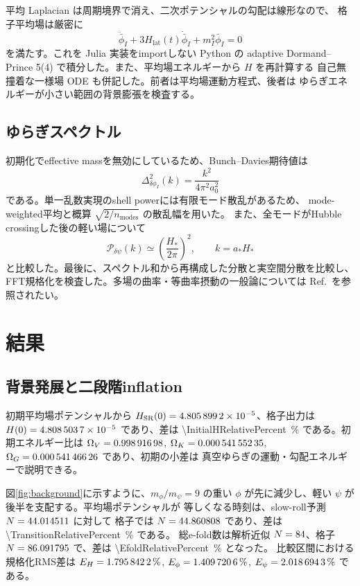 \documentclass[a4paper,11pt]{ltjsarticle}
\begin{document}
平均 Laplacian は周期境界で消え、二次ポテンシャルの勾配は線形なので、
格子平均場は厳密に
\begin{equation}
 \ddot{\bar\phi}_I+3H_{\mathrm{lat}}(t)\dot{\bar\phi}_I
 +m_I^2\bar\phi_I=0
\end{equation}
を満たす。これを Julia 実装をimportしない Python の adaptive
Dormand--Prince 5(4) で積分した。また、平均場エネルギーから $H$ を再計算する
自己無撞着な一様場 ODE も併記した。前者は平均場運動方程式、後者は
ゆらぎエネルギーが小さい範囲の背景膨張を検査する。

\subsection{ゆらぎスペクトル}

初期化でeffective massを無効にしているため、Bunch--Davies期待値は
\begin{equation}
 \Delta_{\delta\phi_I}^2(k)=\frac{k^2}{4\pi^2a_0^2}
\end{equation}
である。単一乱数実現のshell powerには有限モード散乱があるため、
mode-weighted平均と概算 $\sqrt{2/n_{\mathrm{modes}}}$ の散乱幅を用いた。
また、全モードがHubble crossingした後の軽い場について
\begin{equation}
 \mathcal P_{\delta\psi}(k)\simeq
 \left(\frac{H_*}{2\pi}\right)^2,\qquad k=a_*H_*
\end{equation}
と比較した。最後に、スペクトル和から再構成した分散と実空間分散を比較し、
FFT規格化を検査した。多場の曲率・等曲率摂動の一般論については
Ref.~\cite{Gordon2001}を参照されたい。

\section{結果}

\subsection{背景発展と二段階inflation}

初期平均場ポテンシャルから
$H_{\mathrm{SR}}(0)=\num{4.8058992e-05}$、格子出力は
$H(0)=\num{4.8085037e-05}$ であり、差は
\SI{\InitialHRelativePercent}{\percent} である。初期エネルギー比は
$\Omega_V=\num{0.99891698}$,
$\Omega_K=\num{0.00054155235}$,
$\Omega_G=\num{0.00054146626}$ であり、初期の小差は
真空ゆらぎの運動・勾配エネルギーで説明できる。

図\ref{fig:background}に示すように、$m_\phi/m_\psi=9$ の重い
$\phi$ が先に減少し、軽い $\psi$ が後半を支配する。平均場ポテンシャルが
等しくなる時刻は、slow-roll予測 $N=44.014511$ に対して
格子では $N=44.860808$ であり、差は
\SI{\TransitionRelativePercent}{\percent} である。
総e-fold数は解析近似 $N=84$、格子
$N=86.091795$ で、差は \SI{\EfoldRelativePercent}{\percent} となった。
比較区間における規格化RMS差は
$E_H=\SI{1.7958422}{\percent}$,
$E_\phi=\SI{1.4097206}{\percent}$,
$E_\psi=\SI{2.0186943}{\percent}$ である。
\end{document}
